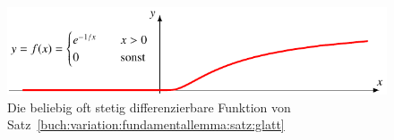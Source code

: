 %
%
%
\begin{figure}
\centering
\includegraphics{chapters/020-variation/images/f.pdf}
\caption{Die beliebig oft stetig differenzierbare Funktion von
Satz~\ref{buch:variation:fundamentallemma:satz:glatt}
\label{buch:variation:fundamentallemma:fig:glatt}}
\end{figure}
